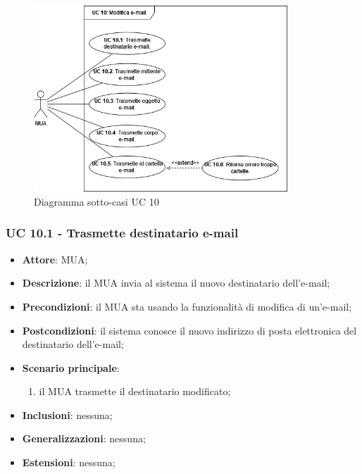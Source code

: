     \begin{figure}[H]
        \includegraphics[width=0.85\textwidth]{sections/uc_imgs/UC10.png}
        \centering
        \caption{Diagramma sotto-casi UC 10}
    \end{figure}

    \subsubsection{UC 10.1 - Trasmette destinatario e-mail} \label{sec:UC10.1}
    \begin{itemize}
        \item \textbf{Attore}: MUA;
        \item \textbf{Descrizione}: il MUA invia al sistema il nuovo destinatario dell'e-mail;
        \item \textbf{Precondizioni}: il MUA sta usando la funzionalità di modifica di un'e-mail;
        \item \textbf{Postcondizioni}: il sistema conosce il nuovo indirizzo di posta elettronica del destinatario dell'e-mail;
        \item \textbf{Scenario principale}:
            \begin{enumerate}
                \item il MUA trasmette il destinatario modificato;
            \end{enumerate}
        \item \textbf{Inclusioni}: nessuna;
        \item \textbf{Generalizzazioni}: nessuna;
        \item \textbf{Estensioni}: nessuna;
    \end{itemize}


